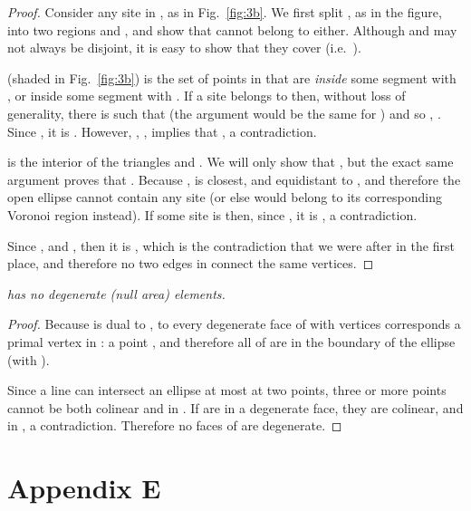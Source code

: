 \documentclass[11pt]{article}
\begin{document}
\begin{proof}
Consider any site  in , as in Fig.~\ref{fig:3b}. 
We first split , as in the figure, into two regions  and
, and show that  cannot belong to either. 
Although  and  may not always be disjoint, it is easy to show that
they cover  (i.e.\  ).

 (shaded in Fig.~\ref{fig:3b}) is the set of points in  that are \emph{inside} some segment
 with , or inside
some segment  with . 
If a site  belongs to  then, without loss of generality, there is  
such that  
(the argument would be the same for ) 
and so , . 
Since , it is . However, , , 
	implies that , a contradiction. 


 is the interior of the triangles  and
. We will only show that , but the 
exact same argument proves that .
Because ,  is closest, and equidistant 
to , and therefore the open ellipse  cannot contain any site (or else  would
belong to its corresponding Voronoi region instead). 
If some site  is  then, since
, it is 
, a
contradiction. 

Since , and , then it is
, which is the contradiction that we were after in the first
place, and therefore no two edges in  connect the same vertices. 
\end{proof}



\emph{
	 has no degenerate (null area) elements. }
\begin{proof}
Because  is dual to , to every degenerate face of  with 
vertices  corresponds a primal vertex in : a point , and therefore
all of  are in the boundary of the ellipse 
 (with ). 

Since a line can intersect an ellipse at most at two points, 
three or more points cannot be both colinear and in . 
If  are in a degenerate face, they are colinear, and in , a contradiction. 
Therefore no faces of  are degenerate. 
\end{proof}












\section*{Appendix E}\label{app:boundary}
\end{document}
